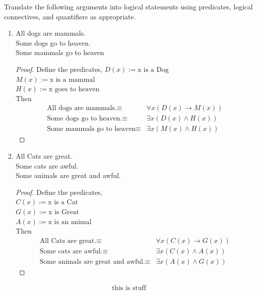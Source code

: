\begin{exmp}
Translate the following arguments into logical statements using predicates, logical connectives, and quantifiers as appropriate.

  \begin{enumerate}
      \item
    All dogs are mammals.\\
    Some dogs go to heaven.\\
    Some mammals go to heaven
\vspace{3cm}
\begin{proof}
Define the predicates,
$D(x):=\text{x is a Dog}$\\
$M(x):=\text{x is a mammal}$\\
$H(x):=\text{x goes to heaven}$\\
Then
\begin{align}
\text{All dogs are mammals.}\equiv& \forall x (D(x)\to M(x))\\
\text{Some dogs go to heaven.}\equiv& \exists x (D(x)\land H(x))\\
\text{Some mammals go to heaven}\equiv& \exists x(M(x) \land H(x))
\end{align}


\end{proof}

  \item
    All Cats are great.\\
    Some cats are awful.\\
    Some animals are great and awful.
    \vspace{3cm}
    \begin{proof}
Define the predicates,\hspace*{\fill} \\ 
$C(x):=\text{x is a Cat}$ \hspace*{\fill} \\ 
$G(x):=\text{x is Great}$\hspace*{\fill} \\ 
$A(x):=\text{x is an animal}$\hspace*{\fill} \\ 

Then
\begin{align}
\text{All Cats are great.}\equiv& \forall x (C(x)\to G(x))\\
\text{Some cats are awful.}\equiv& \exists x (C(x)\land A(x))\\
\text{Some animals are great and awful.}\equiv& \exists x (A(x) \land G(x))
\end{align}


\end{proof}
    
  \end{enumerate}
\begin{align}
\text{this is stuff}
\end{align}
\end{exmp}

